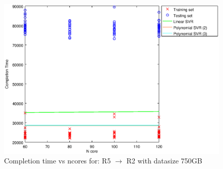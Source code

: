 
\begin {figure}[hbtp]
\centering
\includegraphics[width=\textwidth]{output/R5_R2_750_ALL_FEATURES/plot_R5_R2_750_bestmodels.eps}
\caption{Completion time vs ncores for: R5 $\rightarrow$ R2 with datasize 750GB}
\label{fig:coreonly_linear_R5_R2_750}
\end {figure}
